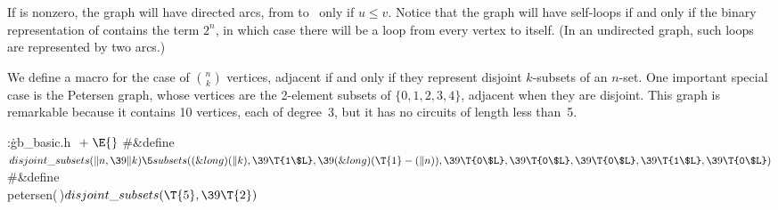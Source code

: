 If  is nonzero, the graph will have directed arcs, from 
to~ only if $u\le v$. Notice that the graph will have self-loops if
and only if the binary representation of  contains the term
$2^n$, in which case there will be a loop from every vertex to itself.
(In an undirected graph, such loops are represented by two arcs.)

We define a macro  for the case
of $n\choose k$ vertices, adjacent if and only if they represent
disjoint $k$-subsets of an $n$-set.
One important special case is the Petersen graph, whose vertices
are the 2-element subsets of $\{0,1,2,3,4\}$, adjacent when they
are disjoint. This graph is remarkable because it contains 10 vertices,
each of degree~3, but it has no circuits of length less than~5.

\Y\B\4:\.{gb\_basic.h }\X${}\mathrel+\E{}$\6
\8\#\&{define} ${}\\{disjoint\_subsets}(\|n,\39\|k)\5\\{subsets}((\&{long})(%
\|k),\39\T{1\$L},\39(\&{long})(\T{1}-(\|n)),\39\T{0\$L},\39\T{0\$L},\39\T{0%
\$L},\39\T{1\$L},\39\T{0\$L}){}$\6
\8\#\&{define} \\{petersen}(\,)\5${}\\{disjoint\_subsets}(\T{5},\39\T{2}){}$\par
\fi

